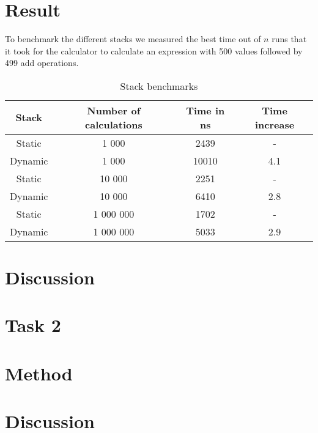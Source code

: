 \documentclass[a4paper,11pt]{article}
\begin{document}
\section*{Result}
To benchmark the different stacks we measured the best time out of $n$ runs that it took for the calculator to
calculate an expression with 500 values followed by 499 add operations.
\begin{table}
  \begin{center}
    \begin{tabular}{|c|c|c|c|}
      \hline
      \textbf{Stack} & \textbf{Number of calculations} & \textbf{Time in ns} & \textbf{Time increase} \\
      \hline
      Static         & 1 000                           & 2439                & -                      \\
      Dynamic        & 1 000                           & 10010               & 4.1                    \\
      \hline
      Static         & 10 000                          & 2251                & -                      \\
      Dynamic        & 10 000                          & 6410                & 2.8                    \\
      \hline
      Static         & 1 000 000                       & 1702                & -                      \\
      Dynamic        & 1 000 000                       & 5033                & 2.9                    \\
      \hline
    \end{tabular}
    \caption{Stack benchmarks}
    \label{tab:task1}
  \end{center}
\end{table}


\section*{Discussion}


\section*{Task 2}


\section*{Method}



\section*{Discussion}
\end{document}
